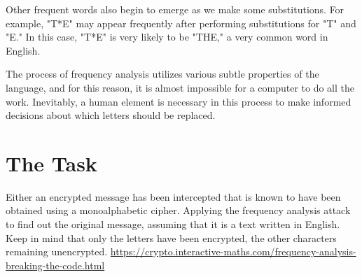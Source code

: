\documentclass[12pt]{article}
\begin{document}
Other frequent words also begin to emerge as we make some substitutions. For example, "T*E" may appear frequently after performing substitutions for "T" and "E." In this case, "T*E" is very likely to be "THE," a very common word in English.

The process of frequency analysis utilizes various subtle properties of the language, and for this reason, it is almost impossible for a computer to do all the work. Inevitably, a human element is necessary in this process to make informed decisions about which letters should be replaced.


\section*{The Task}

Either an encrypted message has been intercepted that is known to have been obtained using a monoalphabetic cipher. Applying the frequency analysis attack to find out the original message, assuming that it is a text written in English. Keep in mind that only the letters have been encrypted, the other characters remaining unencrypted.
\url{https://crypto.interactive-maths.com/frequency-analysis-breaking-the-code.html}
\end{document}
